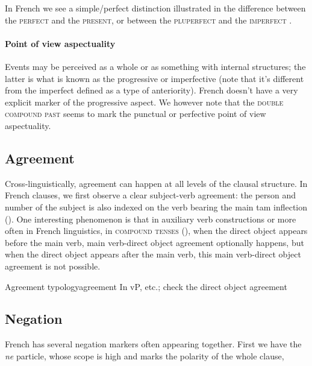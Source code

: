 \documentclass[a4paper, oneside, 12pt]{report}
\newcommand*{\citepage}[1]{p.~{#1}}
\newcommand{\form}[1]{\emph{#1}}
\newcommand*{\category}[1]{\textsc{#1}}
\begin{document}
In French we see a simple/perfect distinction illustrated
in the difference between the \category{perfect} and the \category{present},
or between the \category{pluperfect} and the \category{imperfect}
\citep[\citepage{148}]{l1999advanced}.

\paragraph*{Point of view aspectuality}
Events may be perceived as a whole or as something with internal structures;
the latter is what is known as the progressive or imperfective
(note that it's different from the imperfect defined as a type of anteriority).
French doesn't have a very explicit marker of the progressive aspect.
We however note that the \category{double compound past} \citep[\citepage{152}]{l1999advanced}
seems to mark the punctual or perfective point of view aspectuality.

\subsection{Agreement}

Cross-linguistically, agreement can happen at all levels of the clausal structure.
In French clauses, we first observe a clear subject-verb agreement:
the person and number of the subject is also indexed on the verb bearing the main \ac{tam} inflection
().
One interesting phenomenon is that in auxiliary verb constructions 
or more often in French linguistics, in \category{compound tenses} (),
when the direct object appears before the main verb, main verb-direct object agreement optionally happens,
but when the direct object appears after the main verb,
this main verb-direct object agreement is not possible.

\begin{todobox}{Agreement typology}{agreement}
    In vP, etc.; check the direct object agreement
\end{todobox}

\subsection{Negation}

French has several negation markers often appearing together.
First we have the \form{ne} particle, whose scope is high
and marks the polarity of the whole clause,
\end{document}

